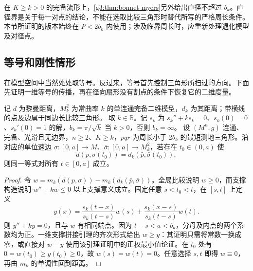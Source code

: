 在 \(K\ge k>0\) 的完备流形上，\cref{g3:thm:bonnet-myers}另外给出直径不超过 \(b_k\)。直径界是关于每一对点的结论，不能在选取比较三角形时替代所写的严格周长条件。本节所证明的版本始终在 \(P<2b_k\) 内使用；涉及临界周长时，应重新处理退化模型及对径点。

\subsection{等号和刚性情形}
\label{g3:subsec:0903:05}

在模型空间中当然处处取等号。反过来，等号首先控制三角形所扫过的方向。下面先证明一维等号的传播，再在径向扇形没有割点的条件下恢复它的二维度量。

\begin{proposition}\label{g3:prop:toponogov-profile-rigidity}
	记 \(d\) 为黎曼距离，\(M_k^2\) 为常曲率 \(k\) 的单连通完备二维模型，\(d_k\) 为其距离；带横线的点及边属于同边长比较三角形。
	取 \(k\in\mathbb R\)。记 \(s_k\) 为 \(s_k''+ks_k=0\)、\(s_k(0)=0\)、\(s_k'(0)=1\) 的解，\(b_k=\pi/\sqrt k\) 当 \(k>0\)，否则 \(b_k=\infty\)。
 设 \((M^n,g)\) 连通、完备、光滑且无边界，\(n\ge2\)、\(K\ge k\)，\(pqr\) 为周长小于 \(2b_k\) 的最短测地三角形。沿对应的单位速边 \(\sigma:[0,a]\to M\)、\(\bar\sigma:[0,a]\to M_k^2\)，若存在 \(t_0\in(0,a)\) 使
 \[
 d(p,\sigma(t_0))=d_k(\bar p,\bar\sigma(t_0)),
 \]
 则同一等式对所有 \(t\in[0,a]\) 成立。
\end{proposition}
\begin{proof}
 令 \(w=m_k(d(p,\sigma))-m_k(d_k(\bar p,\bar\sigma))\)。全局比较说明 \(w\ge0\)，而支撑构造说明 \(w''+kw\le0\) 以上支撑意义成立。固定任意 \(s<t_0<t\)，在 \([s,t]\) 上定义
 \[
 y(x)=\frac{s_k(t-x)}{s_k(t-s)}w(s)
      +\frac{s_k(x-s)}{s_k(t-s)}w(t).
 \]
 则 \(y''+ky=0\)，且与 \(w\) 有相同端点。因为 \(t-s<a<b_k\)，分母及内点的两个系数均为正。一维支撑拼接引理的齐次形式给出 \(w\ge y\)：其证明只需将常数一换成零，或直接对 \(w-y\) 使用该引理证明中的正权最小值论证。在 \(t_0\) 处有
 \(0=w(t_0)\ge y(t_0)\ge0\)，故 \(w(s)=w(t)=0\)。任意选择 \(s,t\) 即得 \(w\equiv0\)，再由 \(m_k\) 的单调性回到距离。
\end{proof}

